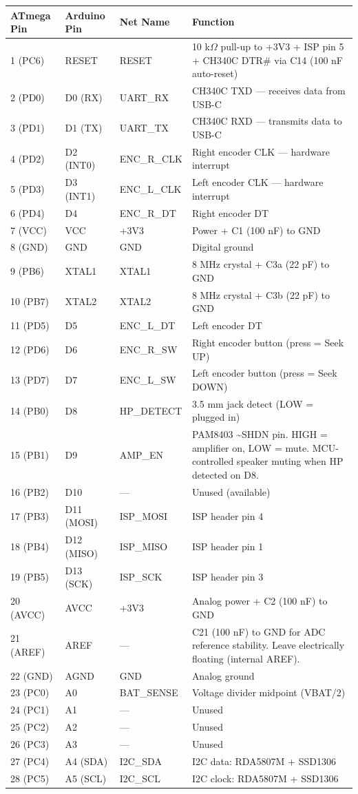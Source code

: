 \documentclass[a4paper,11pt]{article}
\renewcommand*{\,}{ }%
\begin{document}
\begin{longtable}{@{}p{1.5cm}p{2.5cm}p{2.5cm}p{6cm}@{}}
\toprule
\textbf{ATmega Pin} & \textbf{Arduino Pin} & \textbf{Net Name} & \textbf{Function} \\
\midrule
\endhead
1 (PC6) & RESET & RESET & 10\,k$\Omega$ pull-up to +3V3 + ISP pin 5 + CH340C DTR\# via C14 (100\,nF auto-reset) \\
2 (PD0) & D0 (RX) & UART\_RX & CH340C TXD --- receives data from USB-C \\
3 (PD1) & D1 (TX) & UART\_TX & CH340C RXD --- transmits data to USB-C \\
4 (PD2) & D2 (INT0) & ENC\_R\_CLK & Right encoder CLK --- hardware interrupt \\
5 (PD3) & D3 (INT1) & ENC\_L\_CLK & Left encoder CLK --- hardware interrupt \\
6 (PD4) & D4 & ENC\_R\_DT & Right encoder DT \\
7 (VCC) & VCC & +3V3 & Power + C1 (100\,nF) to GND \\
8 (GND) & GND & GND & Digital ground \\
9 (PB6) & XTAL1 & XTAL1 & 8\,MHz crystal + C3a (22\,pF) to GND \\
10 (PB7) & XTAL2 & XTAL2 & 8\,MHz crystal + C3b (22\,pF) to GND \\
11 (PD5) & D5 & ENC\_L\_DT & Left encoder DT \\
12 (PD6) & D6 & ENC\_R\_SW & Right encoder button (press = Seek UP) \\
13 (PD7) & D7 & ENC\_L\_SW & Left encoder button (press = Seek DOWN) \\
14 (PB0) & D8 & HP\_DETECT & 3.5\,mm jack detect (LOW = plugged in) \\
15 (PB1) & D9 & AMP\_EN & PAM8403 \textasciitilde{}SHDN pin. HIGH = amplifier on, LOW = mute. MCU-controlled speaker muting when HP detected on D8. \\
16 (PB2) & D10 & --- & Unused (available) \\
17 (PB3) & D11 (MOSI) & ISP\_MOSI & ISP header pin 4 \\
18 (PB4) & D12 (MISO) & ISP\_MISO & ISP header pin 1 \\
19 (PB5) & D13 (SCK) & ISP\_SCK & ISP header pin 3 \\
20 (AVCC) & AVCC & +3V3 & Analog power + C2 (100\,nF) to GND \\
21 (AREF) & AREF & --- & C21 (100\,nF) to GND for ADC reference stability. Leave electrically floating (internal AREF). \\
22 (GND) & AGND & GND & Analog ground \\
23 (PC0) & A0 & BAT\_SENSE & Voltage divider midpoint (VBAT/2) \\
24 (PC1) & A1 & --- & Unused \\
25 (PC2) & A2 & --- & Unused \\
26 (PC3) & A3 & --- & Unused \\
27 (PC4) & A4 (SDA) & I2C\_SDA & I2C data: RDA5807M + SSD1306 \\
28 (PC5) & A5 (SCL) & I2C\_SCL & I2C clock: RDA5807M + SSD1306 \\
\bottomrule
\end{longtable}
\end{document}

